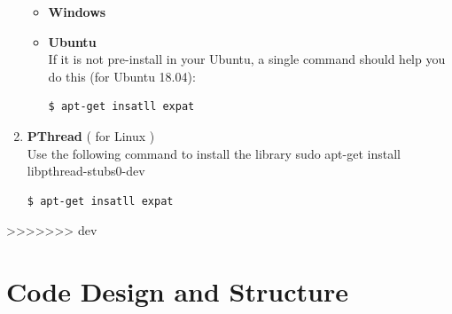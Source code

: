 \documentclass[a4paper, 12pt, english]{book}
\begin{document}
\begin{enumerate}
	\begin{itemize}[noitemsep]
	\item {\textbf{Windows}} \\
	\item {\textbf{Ubuntu}} \\
	If it is not pre-install in your Ubuntu, a single command 
	should help you do this (for Ubuntu 18.04):
	\begin{lstlisting}[language=bash]
$ apt-get insatll expat
	\end{lstlisting}
	\end{itemize}
	\item {\textbf{PThread}} ( for Linux ) \\
	Use the following command to install the library
	sudo apt-get install libpthread-stubs0-dev
	\begin{lstlisting}[language=bash]
$ apt-get insatll expat
	\end{lstlisting}
	
\end{enumerate}








>>>>>>> dev
\chapter{Code Design and Structure}




\\
\end{document}
